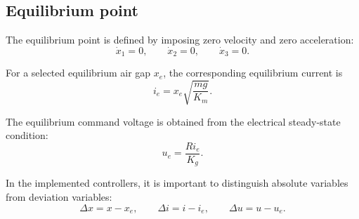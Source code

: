 \subsection{Equilibrium point}

The equilibrium point is defined by imposing zero velocity and zero acceleration:
\begin{equation}
    \dot{x}_1 = 0, \qquad \dot{x}_2 = 0, \qquad \dot{x}_3 = 0.
\end{equation}

For a selected equilibrium air gap $x_e$, the corresponding equilibrium current is
\begin{equation}
    i_e = x_e \sqrt{\frac{m g}{K_m}}.
    \label{eq:equilibrium_current}
\end{equation}

The equilibrium command voltage is obtained from the electrical steady-state condition:
\begin{equation}
    u_e = \frac{R i_e}{K_g}.
    \label{eq:equilibrium_voltage}
\end{equation}

In the implemented controllers, it is important to distinguish absolute variables from deviation variables:
\begin{equation}
    \Delta x = x - x_e, \qquad \Delta i = i - i_e, \qquad \Delta u = u - u_e.
\end{equation}
